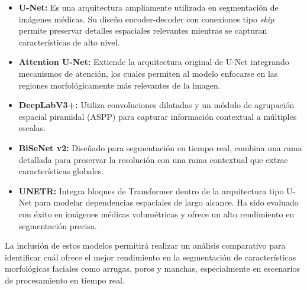 \begin{itemize}
    \item \textbf{U-Net:} Es una arquitectura ampliamente utilizada en segmentación de imágenes médicas. Su diseño encoder-decoder con conexiones tipo \textit{skip} permite preservar detalles espaciales relevantes mientras se capturan características de alto nivel. \parencite{ronneberger2015unet}

    \item \textbf{Attention U-Net:} Extiende la arquitectura original de U-Net integrando mecanismos de atención, los cuales permiten al modelo enfocarse en las regiones morfológicamente más relevantes de la imagen. \parencite{oktay2018attentionunet}

    \item \textbf{DeepLabV3+:} Utiliza convoluciones dilatadas y un módulo de agrupación espacial piramidal (ASPP) para capturar información contextual a múltiples escalas. \parencite{chen2018deeplabv3plus}

    \item \textbf{BiSeNet v2:} Diseñado para segmentación en tiempo real, combina una rama detallada para preservar la resolución con una rama contextual que extrae características globales. \parencite{yu2021bisenetv2}

    \item \textbf{UNETR:} Integra bloques de Transformer dentro de la arquitectura tipo U-Net para modelar dependencias espaciales de largo alcance. Ha sido evaluado con éxito en imágenes médicas volumétricas y ofrece un alto rendimiento en segmentación precisa. \parencite{hatamizadeh2022unetr}
\end{itemize}

La inclusión de estos modelos permitirá realizar un análisis comparativo para identificar cuál ofrece el mejor rendimiento en la segmentación de características morfológicas faciales como arrugas, poros y manchas, especialmente en escenarios de procesamiento en tiempo real.








